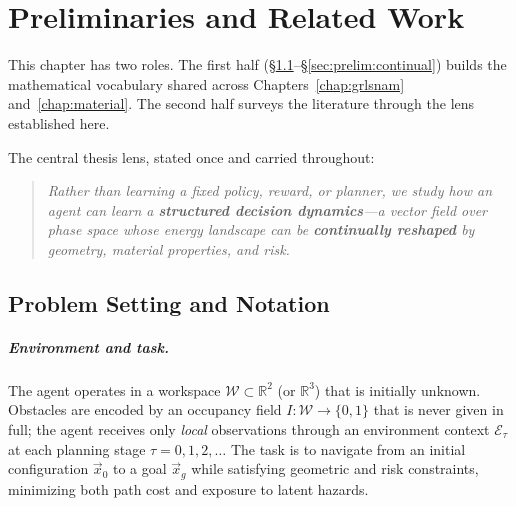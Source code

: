 
\chapter{Preliminaries and Related Work}
\label{chap:background}

\providecommand{\Ham}{\mathcal{H}}
\providecommand{\Energy}{\mathcal{E}}
\providecommand{\Potential}{\mathcal{R}}
\providecommand{\Constraints}{\mathcal{C}}
\providecommand{\Navigator}{\mathsf{N}}
\providecommand{\PhaseState}{z}
\providecommand{\Pos}{q}
\providecommand{\Mom}{p}
\providecommand{\Mass}{\mathrm{M}}
\providecommand{\J}{\mathbb{J}}
\providecommand{\Lag}{\mathscr{L}}
\providecommand{\mult}{\boldsymbol{\lambda}}
\providecommand{\pen}{\boldsymbol{\rho}}

This chapter has two roles.
The first half (\S\ref{sec:prelim:setting}--\S\ref{sec:prelim:continual})
builds the mathematical vocabulary shared across Chapters~\ref{chap:grlsnam}
and~\ref{chap:material}.
The second half surveys
the literature through the lens established here.

The central thesis lens, stated once and carried throughout:

\begin{quote}\itshape
Rather than learning a fixed policy, reward, or planner, we study
how an agent can learn a \textbf{structured decision dynamics}—a vector field
over phase space whose energy landscape can be \textbf{continually reshaped}
by geometry, material properties, and risk.
\end{quote}

\section{Problem Setting and Notation}
\label{sec:prelim:setting}

\paragraph{Environment and task.}
The agent operates in a workspace $\mathcal{W} \subset \mathbb{R}^2$ (or $\mathbb{R}^3$)
that is initially unknown.
Obstacles are encoded by an occupancy field
$I : \mathcal{W} \to \{0,1\}$ that is never given in full;
the agent receives only \emph{local} observations through an environment
context $\mathcal{E}_\tau$ at each planning stage $\tau = 0, 1, 2, \ldots$
The task is to navigate from an initial configuration $\vec{x}_0$ to a goal
$\vec{x}_g$ while satisfying geometric and risk constraints, minimizing
both path cost and exposure to latent hazards.

